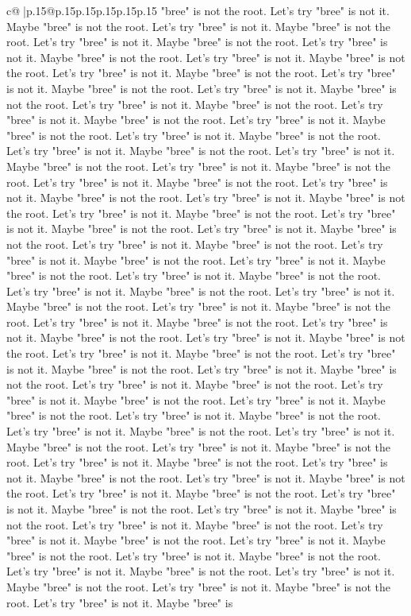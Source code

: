\documentclass{article}
\begin{document}
{\begin{supertabular}{c@{$\;$}|p{.15\linewidth}@{}p{.15\linewidth}p{.15\linewidth}p{.15\linewidth}p{.15\linewidth}p{.15\linewidth}}
{{{"bree" is not the root. Let's try "bree" is not it. Maybe "bree" is not the root. Let's try "bree" is not it. Maybe "bree" is not the root. Let's try "bree" is not it. Maybe "bree" is not the root. Let's try "bree" is not it. Maybe "bree" is not the root. Let's try "bree" is not it. Maybe "bree" is not the root. Let's try "bree" is not it. Maybe "bree" is not the root. Let's try "bree" is not it. Maybe "bree" is not the root. Let's try "bree" is not it. Maybe "bree" is not the root. Let's try "bree" is not it. Maybe "bree" is not the root. Let's try "bree" is not it. Maybe "bree" is not the root. Let's try "bree" is not it. Maybe "bree" is not the root. Let's try "bree" is not it. Maybe "bree" is not the root. Let's try "bree" is not it. Maybe "bree" is not the root. Let's try "bree" is not it. Maybe "bree" is not the root. Let's try "bree" is not it. Maybe "bree" is not the root. Let's try "bree" is not it. Maybe "bree" is not the root. Let's try "bree" is not it. Maybe "bree" is not the root. Let's try "bree" is not it. Maybe "bree" is not the root. Let's try "bree" is not it. Maybe "bree" is not the root. Let's try "bree" is not it. Maybe "bree" is not the root. Let's try "bree" is not it. Maybe "bree" is not the root. Let's try "bree" is not it. Maybe "bree" is not the root. Let's try "bree" is not it. Maybe "bree" is not the root. Let's try "bree" is not it. Maybe "bree" is not the root. Let's try "bree" is not it. Maybe "bree" is not the root. Let's try "bree" is not it. Maybe "bree" is not the root. Let's try "bree" is not it. Maybe "bree" is not the root. Let's try "bree" is not it. Maybe "bree" is not the root. Let's try "bree" is not it. Maybe "bree" is not the root. Let's try "bree" is not it. Maybe "bree" is not the root. Let's try "bree" is not it. Maybe "bree" is not the root. Let's try "bree" is not it. Maybe "bree" is not the root. Let's try "bree" is not it. Maybe "bree" is not the root. Let's try "bree" is not it. Maybe "bree" is not the root. Let's try "bree" is not it. Maybe "bree" is not the root. Let's try "bree" is not it. Maybe "bree" is not the root. Let's try "bree" is not it. Maybe "bree" is not the root. Let's try "bree" is not it. Maybe "bree" is not the root. Let's try "bree" is not it. Maybe "bree" is not the root. Let's try "bree" is not it. Maybe "bree" is not the root. Let's try "bree" is not it. Maybe "bree" is not the root. Let's try "bree" is not it. Maybe "bree" is not the root. Let's try "bree" is not it. Maybe "bree" is not the root. Let's try "bree" is not it. Maybe "bree" is not the root. Let's try "bree" is not it. Maybe "bree" is not the root. Let's try "bree" is not it. Maybe "bree" is not the root. Let's try "bree" is not it. Maybe "bree" is not the root. Let's try "bree" is not it. Maybe "bree" is not the root. Let's try "bree" is not it. Maybe "bree" is not the root. Let's try "bree" is not it. Maybe "bree" is not the root. Let's try "bree" is not it. Maybe "bree" is not the root. Let's try "bree" is not it. Maybe "bree" is not the root. Let's try "bree" is not it. Maybe "bree" is not the root. Let's try "bree" is not it. Maybe "bree" is not the root. Let's try "bree" is not it. Maybe "bree" is }}}
\end{supertabular}}
\end{document}

